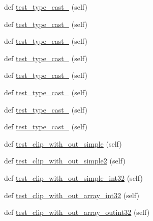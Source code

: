 \begin{DoxyCompactItemize}
\item 
def \hyperlink{classnumpy_1_1core_1_1tests_1_1test__numeric_1_1TestClip_a34bf3e7d6b49062ac636cb34e33c4d9f}{test\+\_\+type\+\_\+cast\+\_} (self)
\item 
def \hyperlink{classnumpy_1_1core_1_1tests_1_1test__numeric_1_1TestClip_a77b2189b04a04348013e86d0d36b7bbc}{test\+\_\+type\+\_\+cast\+\_} (self)
\item 
def \hyperlink{classnumpy_1_1core_1_1tests_1_1test__numeric_1_1TestClip_a8923431a49a842fb9a35ae300ef6992f}{test\+\_\+type\+\_\+cast\+\_} (self)
\item 
def \hyperlink{classnumpy_1_1core_1_1tests_1_1test__numeric_1_1TestClip_a98da0c56921186d667c768879c896666}{test\+\_\+type\+\_\+cast\+\_} (self)
\item 
def \hyperlink{classnumpy_1_1core_1_1tests_1_1test__numeric_1_1TestClip_ac3902b2acf976ae25dc31e6cefc551ba}{test\+\_\+type\+\_\+cast\+\_} (self)
\item 
def \hyperlink{classnumpy_1_1core_1_1tests_1_1test__numeric_1_1TestClip_aed3e230ba44c4d5e9b0e936182a0bdc4}{test\+\_\+type\+\_\+cast\+\_} (self)
\item 
def \hyperlink{classnumpy_1_1core_1_1tests_1_1test__numeric_1_1TestClip_a9d0abc0da0d0883e75bbe387d872bee8}{test\+\_\+type\+\_\+cast\+\_} (self)
\item 
def \hyperlink{classnumpy_1_1core_1_1tests_1_1test__numeric_1_1TestClip_ae27f9c2f8c499df9da060a413af00957}{test\+\_\+type\+\_\+cast\+\_} (self)
\item 
def \hyperlink{classnumpy_1_1core_1_1tests_1_1test__numeric_1_1TestClip_ab3e928737b68e3de17b1a7ad66e10be9}{test\+\_\+clip\+\_\+with\+\_\+out\+\_\+simple} (self)
\item 
def \hyperlink{classnumpy_1_1core_1_1tests_1_1test__numeric_1_1TestClip_ad7ccf0fdd8a59b3a6779f0bf7bf72b76}{test\+\_\+clip\+\_\+with\+\_\+out\+\_\+simple2} (self)
\item 
def \hyperlink{classnumpy_1_1core_1_1tests_1_1test__numeric_1_1TestClip_aaaea4e39652a9073c68c6f96d7638ca6}{test\+\_\+clip\+\_\+with\+\_\+out\+\_\+simple\+\_\+int32} (self)
\item 
def \hyperlink{classnumpy_1_1core_1_1tests_1_1test__numeric_1_1TestClip_a5e8a81ed72701757353ca29f73205bac}{test\+\_\+clip\+\_\+with\+\_\+out\+\_\+array\+\_\+int32} (self)
\item 
def \hyperlink{classnumpy_1_1core_1_1tests_1_1test__numeric_1_1TestClip_a7c8fd5f315e5c8d3d61008371331228b}{test\+\_\+clip\+\_\+with\+\_\+out\+\_\+array\+\_\+outint32} (self)

\end{DoxyCompactItemize}
